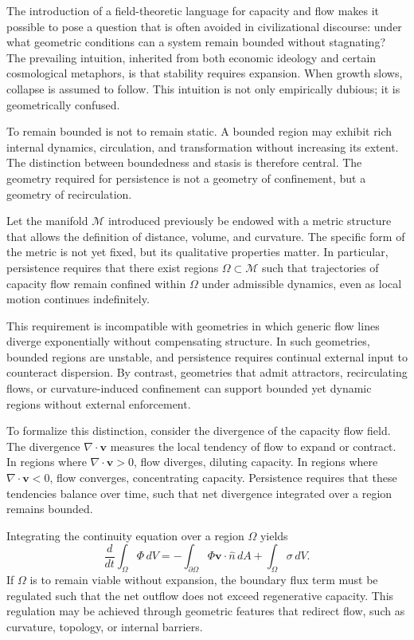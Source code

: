 \documentclass[12pt,oneside]{book}
\begin{document}
The introduction of a field-theoretic language for capacity and flow makes it possible to pose a question that is often avoided in civilizational discourse: under what geometric conditions can a system remain bounded without stagnating? The prevailing intuition, inherited from both economic ideology and certain cosmological metaphors, is that stability requires expansion. When growth slows, collapse is assumed to follow. This intuition is not only empirically dubious; it is geometrically confused.

To remain bounded is not to remain static. A bounded region may exhibit rich internal dynamics, circulation, and transformation without increasing its extent. The distinction between boundedness and stasis is therefore central. The geometry required for persistence is not a geometry of confinement, but a geometry of recirculation.

Let the manifold \(\mathcal{M}\) introduced previously be endowed with a metric structure that allows the definition of distance, volume, and curvature. The specific form of the metric is not yet fixed, but its qualitative properties matter. In particular, persistence requires that there exist regions \(\Omega \subset \mathcal{M}\) such that trajectories of capacity flow remain confined within \(\Omega\) under admissible dynamics, even as local motion continues indefinitely.

This requirement is incompatible with geometries in which generic flow lines diverge exponentially without compensating structure. In such geometries, bounded regions are unstable, and persistence requires continual external input to counteract dispersion. By contrast, geometries that admit attractors, recirculating flows, or curvature-induced confinement can support bounded yet dynamic regions without external enforcement.

To formalize this distinction, consider the divergence of the capacity flow field. The divergence \(\nabla \cdot \mathbf{v}\) measures the local tendency of flow to expand or contract. In regions where \(\nabla \cdot \mathbf{v} > 0\), flow diverges, diluting capacity. In regions where \(\nabla \cdot \mathbf{v} < 0\), flow converges, concentrating capacity. Persistence requires that these tendencies balance over time, such that net divergence integrated over a region remains bounded.

Integrating the continuity equation over a region \(\Omega\) yields
\[
\frac{d}{dt} \int_{\Omega} \Phi \, dV
=
- \int_{\partial \Omega} \Phi \mathbf{v} \cdot \hat{n} \, dA
+ \int_{\Omega} \sigma \, dV.
\]
If \(\Omega\) is to remain viable without expansion, the boundary flux term must be regulated such that the net outflow does not exceed regenerative capacity. This regulation may be achieved through geometric features that redirect flow, such as curvature, topology, or internal barriers.
\end{document}
